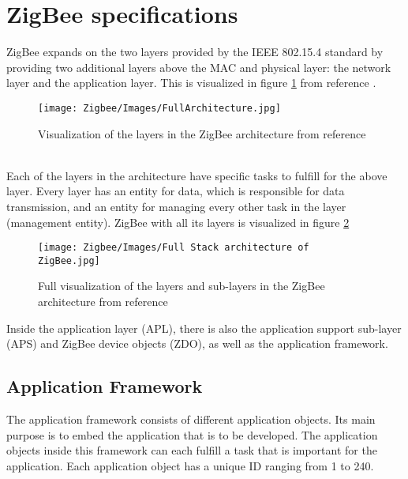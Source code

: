 \documentclass[conference]{IEEEtran}
\begin{document}
\section{ZigBee specifications}
ZigBee expands on the two layers provided by the IEEE 802.15.4 standard by providing two additional layers above the MAC and physical layer: the network layer and the application layer\cite{CSAZigBeeSpecs}. This is visualized in figure \ref{fig:ZigBeeArchitecture} from reference \cite{CurrentStatusZigbee}.\\
\begin{figure}[htbp]
    \centering
    \texttt{[image: Zigbee/Images/FullArchitecture.jpg]}
    \caption{Visualization of the layers in the ZigBee architecture from reference \cite{CurrentStatusZigbee}}
    \label{fig:ZigBeeArchitecture}
\end{figure}
\\
Each of the layers in the architecture have specific tasks to fulfill for the above layer. Every layer has an entity for data, which is responsible for data transmission, and an entity for managing every other task in the layer (management entity)\cite{DrahtlosZigbee}. ZigBee with all its layers is visualized in figure \ref{fig:ZigBeeArchitectureFULL}\\

\begin{figure}[htbp]
    \centering
    \texttt{[image: Zigbee/Images/Full Stack architecture of ZigBee.jpg]}
    \caption{Full visualization of the layers and sub-layers in the ZigBee architecture from reference \cite{CSAZigBeeSpecs}}
    \label{fig:ZigBeeArchitectureFULL}
\end{figure}

Inside the application layer (APL), there is also the application support sub-layer (APS) and ZigBee device objects (ZDO), as well as the application framework\cite{CSAZigBeeSpecs}.\\

\subsection{Application Framework}

The application framework consists of different application objects. Its main purpose is to embed the application that is to be developed. The application objects inside this framework can each fulfill a task that is important for the application. Each application object has a unique ID ranging from 1 to 240\cite{DrahtlosZigbee}. 
\end{document}
